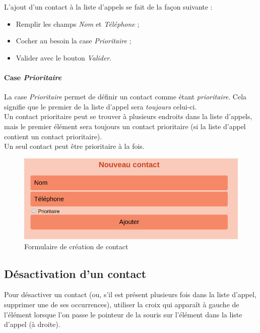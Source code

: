 \documentclass{article}
\begin{document}
L'ajout d'un contact à la liste d'appels se fait de la façon suivante :

\begin{itemize}
    \item Remplir les champs \emph{Nom} et \emph{Téléphone} ;
    \item Cocher au besoin la case \emph{Prioritaire} ;
    \item Valider avec le bouton \emph{Valider}.
\end{itemize}

\paragraph{Case \emph{Prioritaire}\\}

La case \emph{Prioritaire} permet de définir un contact comme étant \emph{prioritaire}. Cela signifie que le premier de la liste d'appel sera \emph{toujours} celui-ci.\\
Un contact prioritaire peut se trouver à plusieurs endroits dans la liste d'appels, mais le premier élément sera toujours un contact prioritaire (si la liste d'appel contient un contact prioritaire). \\
Un seul contact peut être prioritaire à la fois.

\begin{center}
    \begin{figure}[ht]
      \includegraphics[width=\linewidth]{Illustrations/Nouveau_Contact.png}
      \caption{Formulaire de création de contact}
      \label{fig:creation_contact}
    \end{figure}
\end{center}

\subsection{Désactivation d'un contact}

Pour désactiver un contact (ou, s'il est présent plusieurs fois dans la liste d'appel, supprimer une de ses occurrences), utiliser la croix qui apparaît à gauche de l'élément lorsque l'on passe le pointeur de la souris sur l'élément dans la liste d'appel (à droite).\\
\end{document}

